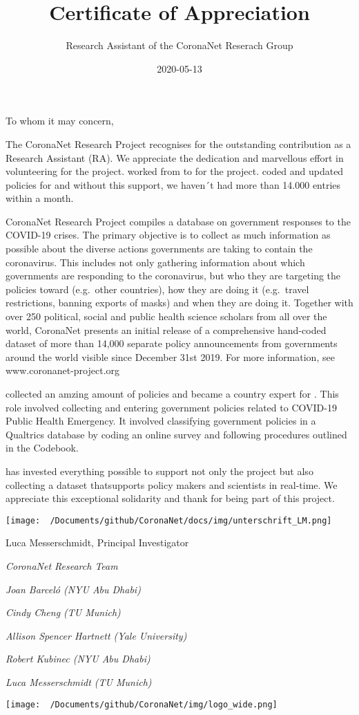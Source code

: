 \documentclass[
]{article}
\title{Certificate of Appreciation}
\author{Research Assistant of the CoronaNet Reserach Group}
\date{2020-05-13}
\begin{document}
\maketitle

To whom it may concern,

The CoronaNet Research Project recognises for the outstanding
contribution as a Research Assistant (RA). We appreciate the dedication
and marvellous effort in volunteering for the project. worked from to
for the project. coded and updated policies for and without this
support, we haven´t had more than 14.000 entries within a month.

CoronaNet Research Project compiles a database on government responses
to the COVID-19 crises. The primary objective is to collect as much
information as possible about the diverse actions governments are taking
to contain the coronavirus. This includes not only gathering information
about which governments are responding to the coronavirus, but who they
are targeting the policies toward (e.g.~other countries), how they are
doing it (e.g.~travel restrictions, banning exports of masks) and when
they are doing it. Together with over 250 political, social and public
health science scholars from all over the world, CoronaNet presents an
initial release of a comprehensive hand-coded dataset of more than
14,000 separate policy announcements from governments around the world
visible since December 31st 2019. For more information, see
www.coronanet-project.org

collected an amzing amount of policies and became a country expert for .
This role involved collecting and entering government policies related
to COVID-19 Public Health Emergency. It involved classifying government
policies in a Qualtrics database by coding an online survey and
following procedures outlined in the Codebook.

has invested everything possible to support not only the project but
also collecting a dataset thatsupports policy makers and scientists in
real-time. We appreciate this exceptional solidarity and thank for being
part of this project.

\texttt{[image: ~/Documents/github/CoronaNet/docs/img/unterschrift\_LM.png]}

Luca Messerschmidt, Principal Investigator

\emph{CoronaNet Research Team}

\emph{Joan Barceló (NYU Abu Dhabi)}

\emph{Cindy Cheng (TU Munich)}

\emph{Allison Spencer Hartnett (Yale University)}

\emph{Robert Kubinec (NYU Abu Dhabi)}

\emph{Luca Messerschmidt (TU Munich)}

\texttt{[image: ~/Documents/github/CoronaNet/img/logo\_wide.png]}
\end{document}

